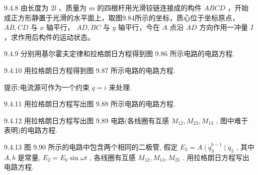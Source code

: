 \begin{problem}{9.4.8}
由长度为 $2l$ 、质量为 $m$ 的四根杆用光滑铰链连接成的构件 $ABCD$ ，开始成正方形静置于光滑的水平面上，取图9.84所示的坐标，质心位于坐标原点， $AB, CD$ 与 $x$ 轴平行， $AD, BC$ 与 $y$ 轴平行，今在 $A$ 点沿 $AD$ 方向作用一冲量 $I$ ，求作用后构件的运动状态。
\begin{center}

\end{center}
\end{problem}
\clearpage


\begin{problem}{9.4.9}
分别用基尔霍夫定律和拉格朗日方程得到图 9.86 所示电路的电路方程.
\begin{center}

\end{center}
\end{problem}
\clearpage


\begin{problem}{9.4.10}
用拉格朗日方程得到图 9.87 所示电路的电路方程.

提示:电流源可作为一个约束 $\dot{q}=i$ 来处理.
\begin{center}

\end{center}
\end{problem}
\clearpage


\begin{problem}{9.4.11}
用拉格朗日方程写出图 9.88 所示电路的电路方程.
\begin{center}

\end{center}
\end{problem}
\clearpage


\begin{problem}{9.4.12}
用拉格朗日方程写出图 9.89 电路(各线圈有互感 $M_{12}, M_{23}, M_{13}$ , 图中难于表明)的电路方程.
\begin{center}

\end{center}
\end{problem}
\clearpage


\begin{problem}{9.4.13}
图 9.90 所示的电路中包含两个相同的二极管, 假定 $E_{3} = A \mid \dot{q}_{3}^{b-1} \mid \dot{q}_{3}$ , 其中 $A, b$ 是常量, $E_{2} = E_{0} \sin \omega t$ , 各线圈有互感 $M_{12}, M_{13}, M_{23}$ . 用拉格朗日方程写出电路方程.
\begin{center}

\end{center}
\end{problem}
\clearpage



